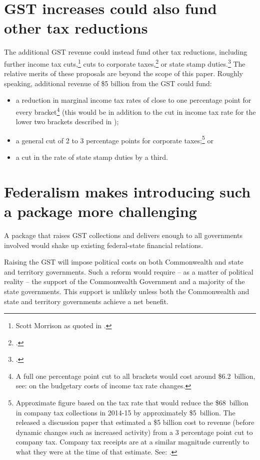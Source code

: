 \section{GST increases could also fund other tax reductions}\label{sec:GST-4-3}
The additional GST revenue could instead fund other tax reductions, including further income tax cuts,\footnote{Scott Morrison as quoted in \textcite{Coorey2015a}.}  cuts to corporate taxes,\footcite{FinancialServicesCouncil2015-Tax-white-paper-submission}  or state stamp duties.\footcite{PropertyCouncil2015-Tax-reform}  The relative merits of these proposals are beyond the scope of this paper. Roughly speaking, additional revenue of \$5 billion from the GST could fund:
\begin{itemize}
\item	a reduction in marginal income tax rates of close to one percentage point for every bracket\footnote{A full one percentage point cut to all brackets would cost around \$6.2~billion, see:  on the budgetary costs of income tax rate changes.}  (this would be in addition to the cut in income tax rate for the lower two brackets described in ); 
\item 	a general cut of 2 to 3 percentage points for corporate taxes;\footnote{Approximate figure based on the tax rate that would reduce the \$68~billion in company tax collections in 2014-15 by approximately \$5~billion. The \textcite{BusinessTaxWorkingGroup2012} released a discussion paper that estimated a \$5 billion cost to revenue (before dynamic changes such as increased activity) from a 3 percentage point cut to company tax. Company tax receipts are at a similar magnitude currently to what they were at the time of that estimate. See: \textcite[][Statement~4]{Treasury2015BudgetPapers201516}.}  or
\item 	a cut in the rate of state stamp duties by a third.
\end{itemize}
\section{Federalism makes introducing such a package more challenging\label{sec:GST-4-4}}
A package that raises GST collections and delivers enough to all governments involved would shake up existing federal-state financial relations. 

Raising the GST will impose political costs on both Commonwealth and state and territory governments. Such a reform would require – as a matter of political reality – the support of the Commonwealth Government and a majority of the state governments. This support is unlikely unless both the Commonwealth and state and territory governments achieve a net benefit. 

